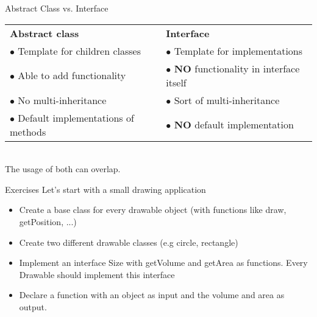 \begin{frame}{Abstract Class vs. Interface}
	\begin{tabularx}{\textheight}{l|l}
		\textbf{Abstract class} & \textbf{Interface} \\
		$\bullet$ Template for children classes & $\bullet$ Template for implementations \\
		$\bullet$ Able to add functionality & $\bullet$ \textbf{NO} functionality in interface itself \\
		$\bullet$ No multi-inheritance & $\bullet$ Sort of multi-inheritance \\
		$\bullet$ Default implementations of methods & $\bullet$ \textbf{NO} default implementation
	\end{tabularx}\\
	\vspace{0.5cm}
	The usage of both can overlap.
\end{frame}

\begin{frame}[fragile]{Exercises}
	Let's start with a small drawing application
	\begin{itemize}
		\item Create a base class for every drawable object (with functions like draw, getPosition, ...)
		\vspace{0.5cm}
		\item Create two different drawable classes (e.g circle, rectangle)
		\vspace{0.5cm}
		\item Implement an interface Size with getVolume and getArea as functions. Every Drawable should implement this interface
		\vspace{0.5cm}
		\item Declare a function with an object as input and the volume and area as output.
	\end{itemize}
\end{frame}

